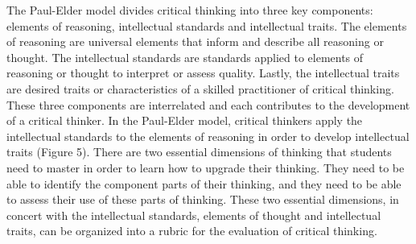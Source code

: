 The Paul-Elder model divides critical thinking into three key components: elements of reasoning, intellectual standards and intellectual traits. The elements of reasoning are universal elements that inform and describe all reasoning or thought. The intellectual standards are standards applied to elements of reasoning or thought to interpret or assess quality. Lastly, the intellectual traits are desired traits or characteristics of a skilled practitioner of critical thinking. These three components are interrelated and each contributes to the development of a critical thinker. In the Paul-Elder model, critical thinkers apply the intellectual standards to the elements of reasoning in order to develop intellectual traits (Figure 5). There are two essential dimensions of thinking that students need to master in order to learn how to upgrade their thinking. They need to be able to identify the component parts of their thinking, and they need to be able to assess their use of these parts of thinking. These two essential dimensions, in concert with the intellectual standards, elements of thought and intellectual traits, can be organized into a rubric for the evaluation of critical thinking.

